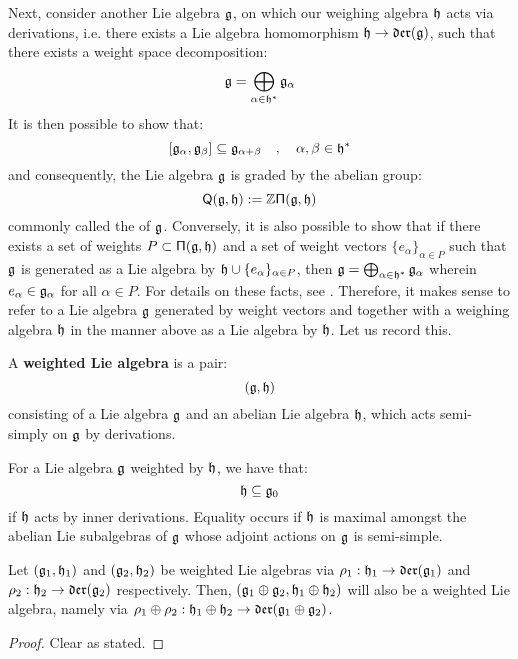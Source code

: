         Next, consider another Lie algebra $\mathfrak{g}$, on which our weighing algebra $\mathfrak{h}$ acts via derivations, i.e. there exists a Lie algebra homomorphism $\mathfrak{h} \to \mathfrak{der}(\mathfrak{g})$, such that there exists a weight space decomposition:
            $$\mathfrak{g} = \bigoplus_{\alpha \in \mathfrak{h}^*} \mathfrak{g}_{\alpha}$$
        It is then possible to show that:
            $$[\mathfrak{g}_{\alpha}, \mathfrak{g}_{\beta}] \subseteq \mathfrak{g}_{\alpha + \beta} \quad, \quad \alpha, \beta \in \mathfrak{h}^*$$
        and consequently, the Lie algebra $\mathfrak{g}$ is graded by the abelian group:
            $$\mathsf{Q}(\mathfrak{g}, \mathfrak{h}) := \mathbb{Z}\mathsf{\Pi}(\mathfrak{g}, \mathfrak{h})$$
        commonly called the  of $\mathfrak{g}$. Conversely, it is also possible to show that if there exists a set of weights $P \subset \mathsf{\Pi}(\mathfrak{g}, \mathfrak{h})$ and a set of weight vectors $\{ e_{\alpha} \}_{\alpha \in P}$ such that $\mathfrak{g}$ is generated as a Lie algebra by $\mathfrak{h} \cup \{ e_{\alpha} \}_{\alpha \in P}$, then $\mathfrak{g} = \bigoplus_{\alpha \in \mathfrak{h}^*} \mathfrak{g}_{\alpha}$ wherein $e_{\alpha} \in \mathfrak{g}_{\alpha}$ for all $\alpha \in P$. For details on these facts, see \cite[Subsection 2.1, Proposition 2]{moody_pianzola_lie_algebras_with_triangular_decompositions}. Therefore, it makes sense to refer to a Lie algebra $\mathfrak{g}$ generated by weight vectors and together with a weighing algebra $\mathfrak{h}$ in the manner above as a Lie algebra  by $\mathfrak{h}$. Let us record this.
        \begin{definition} \label{def: weighted_lie_algebras}
            A \textbf{weighted Lie algebra} is a pair:
                $$(\mathfrak{g}, \mathfrak{h})$$
            consisting of a Lie algebra $\mathfrak{g}$ and an abelian Lie algebra $\mathfrak{h}$, which acts semi-simply on $\mathfrak{g}$ by derivations.
        \end{definition}
        \begin{remark}
            For a Lie algebra $\mathfrak{g}$ weighted by $\mathfrak{h}$, we have that:
                $$\mathfrak{h} \subseteq \mathfrak{g}_0$$
            if $\mathfrak{h}$ acts by inner derivations. Equality occurs if $\mathfrak{h}$ is maximal amongst the abelian Lie subalgebras of $\mathfrak{g}$ whose adjoint actions on $\mathfrak{g}$ is semi-simple.
        \end{remark}
        \begin{lemma} \label{lemma: direct_sums_of_weighted_lie_algebras}
            Let $(\mathfrak{g}_1, \mathfrak{h}_1)$ and $(\mathfrak{g}_2, \mathfrak{h}_2)$ be weighted Lie algebras via $\rho_1: \mathfrak{h}_1 \to \mathfrak{der}(\mathfrak{g}_1)$ and $\rho_2: \mathfrak{h}_2 \to \mathfrak{der}(\mathfrak{g}_2)$ respectively. Then, $(\mathfrak{g}_1 \oplus \mathfrak{g}_2, \mathfrak{h}_1 \oplus \mathfrak{h}_2)$ will also be a weighted Lie algebra, namely via $\rho_1 \oplus \rho_2: \mathfrak{h}_1 \oplus \mathfrak{h}_2 \to \mathfrak{der}(\mathfrak{g}_1 \oplus \mathfrak{g}_2)$.
        \end{lemma}
            \begin{proof}
                Clear as stated.
            \end{proof}


